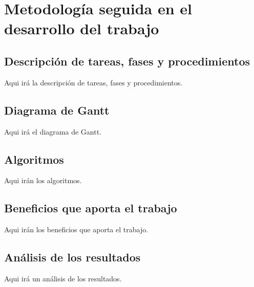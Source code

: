 
\chapter{Metodología seguida en el desarrollo del trabajo} %

\label{Metodología} %

\section{Descripción de tareas, fases y procedimientos}

Aqui irá la descripción de tareas, fases y procedimientos.

\section{Diagrama de Gantt}

Aqui irá el diagrama de Gantt.

\section{Algoritmos}

Aqui irán los algoritmos.

\section{Beneficios que aporta el trabajo}

Aqui irán los beneficios que aporta el trabajo.

\section{Análisis de los resultados}

Aqui irá un análisis de los resultados.


